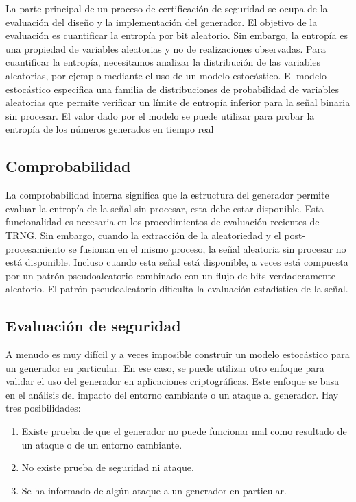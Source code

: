 	La parte principal de un proceso de certificación de seguridad se ocupa de la evaluación del diseño y la implementación del generador. El objetivo de la evaluación es cuantificar la entropía por bit aleatorio. Sin embargo, la entropía es una propiedad de variables aleatorias y no de realizaciones observadas. Para cuantificar la entropía, necesitamos analizar la distribución de las variables aleatorias, por ejemplo mediante el uso de un modelo estocástico. El modelo estocástico especifica una familia de distribuciones de probabilidad de variables aleatorias que permite verificar un límite de entropía inferior para la señal binaria sin procesar. El valor dado por el modelo se puede utilizar para probar la entropía de los números generados en tiempo real
				
	\subsection{Comprobabilidad}
	
	
	La comprobabilidad interna significa que la estructura del generador permite evaluar la entropía de la señal sin procesar, esta debe estar disponible. Esta funcionalidad es necesaria en los procedimientos de evaluación recientes de TRNG. Sin embargo, cuando la extracción de la aleatoriedad y el post-procesamiento se fusionan en el mismo proceso, la señal aleatoria sin procesar no está disponible. Incluso cuando esta señal está disponible, a veces está compuesta por un patrón pseudoaleatorio combinado con un flujo de bits verdaderamente aleatorio. El patrón pseudoaleatorio dificulta la evaluación estadística de la señal.
				

				
	\subsection{Evaluación de seguridad}
				
	A menudo es muy difícil y a veces imposible construir un modelo estocástico para un generador en particular. En ese caso, se puede utilizar otro enfoque para validar el uso del generador en aplicaciones criptográficas. Este enfoque se basa en el análisis del impacto del entorno cambiante o un ataque al generador. Hay tres posibilidades: 
	
	\begin{enumerate}[noitemsep, label=(\roman*)]
		\item Existe prueba de que el generador no puede funcionar mal como resultado de un ataque o de un entorno cambiante.
		\item No existe prueba de seguridad ni ataque.
		\item Se ha informado de algún ataque a un generador en particular.
	\end{enumerate}		

